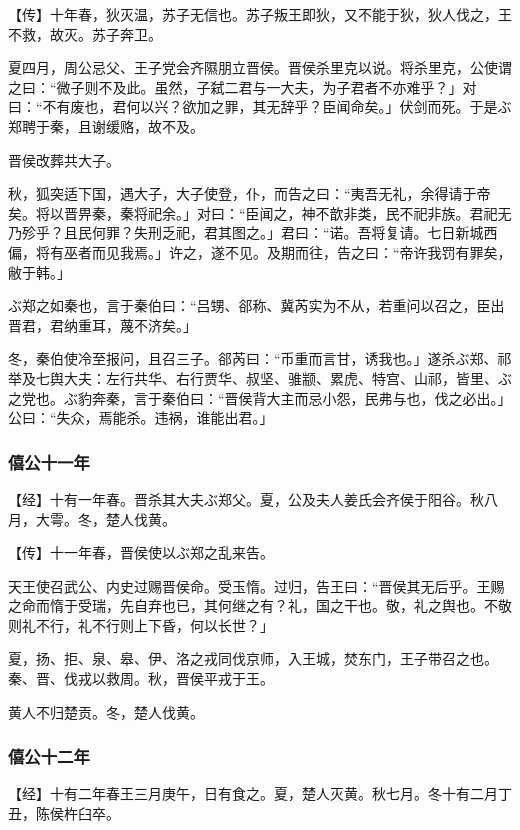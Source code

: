 \documentclass[]{article}
\begin{document}
【传】十年春，狄灭温，苏子无信也。苏子叛王即狄，又不能于狄，狄人伐之，王不救，故灭。苏子奔卫。

夏四月，周公忌父、王子党会齐隰朋立晋侯。晋侯杀里克以说。将杀里克，公使谓之曰：``微子则不及此。虽然，子弑二君与一大夫，为子君者不亦难乎？」对曰：``不有废也，君何以兴？欲加之罪，其无辞乎？臣闻命矣。」伏剑而死。于是ぶ郑聘于秦，且谢缓赂，故不及。

晋侯改葬共大子。

秋，狐突适下国，遇大子，大子使登，仆，而告之曰：``夷吾无礼，余得请于帝矣。将以晋畀秦，秦将祀余。」对曰：``臣闻之，神不歆非类，民不祀非族。君祀无乃殄乎？且民何罪？失刑乏祀，君其图之。」君曰：``诺。吾将复请。七日新城西偏，将有巫者而见我焉。」许之，遂不见。及期而往，告之曰：``帝许我罚有罪矣，敝于韩。」

ぶ郑之如秦也，言于秦伯曰：``吕甥、郤称、冀芮实为不从，若重问以召之，臣出晋君，君纳重耳，蔑不济矣。」

冬，秦伯使冷至报问，且召三子。郤芮曰：``币重而言甘，诱我也。」遂杀ぶ郑、祁举及七舆大夫：左行共华、右行贾华、叔坚、骓颛、累虎、特宫、山祁，皆里、ぶ之党也。ぶ豹奔秦，言于秦伯曰：``晋侯背大主而忌小怨，民弗与也，伐之必出。」公曰：``失众，焉能杀。违祸，谁能出君。」

\hypertarget{header-n763}{%
\subsubsection{僖公十一年}\label{header-n763}}

【经】十有一年春。晋杀其大夫ぶ郑父。夏，公及夫人姜氏会齐侯于阳谷。秋八月，大雩。冬，楚人伐黄。

【传】十一年春，晋侯使以ぶ郑之乱来告。

天王使召武公、内史过赐晋侯命。受玉惰。过归，告王曰：``晋侯其无后乎。王赐之命而惰于受瑞，先自弃也已，其何继之有？礼，国之干也。敬，礼之舆也。不敬则礼不行，礼不行则上下昏，何以长世？」

夏，扬、拒、泉、皋、伊、洛之戎同伐京师，入王城，焚东门，王子带召之也。秦、晋、伐戎以救周。秋，晋侯平戎于王。

黄人不归楚贡。冬，楚人伐黄。

\hypertarget{header-n771}{%
\subsubsection{僖公十二年 }\label{header-n771}}

【经】十有二年春王三月庚午，日有食之。夏，楚人灭黄。秋七月。冬十有二月丁丑，陈侯杵臼卒。
\end{document}
